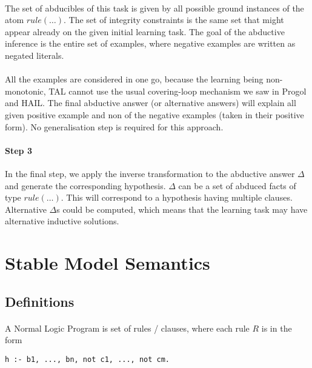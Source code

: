 \documentclass{article}
\theoremstyle{plain}
\theoremstyle{definition}
\begin{document}
\begin{multicols}{2}
\paragraph{} The set of abducibles of this task is given by all possible ground instances of the atom $rule(\dots)$. The set of integrity constraints is the same set that might appear already on the given initial  learning task. The goal of the abductive inference is the entire set of examples, where negative examples are written as negated literals.

\paragraph{} All the examples are considered in one go, because the learning being non-monotonic, TAL cannot use the usual covering-loop mechanism we saw in Progol and HAIL. The final abductive answer (or alternative answers) will explain all given positive example and non of the negative examples (taken in their positive form). No generalisation step is required for this approach.

\paragraph{Step 3} In the final step, we apply the inverse transformation to the abductive answer $\Delta$ and generate the corresponding hypothesis. $\Delta$ can be a set of abduced facts of type $rule(\dots)$. This will correspond to a hypothesis having multiple clauses. Alternative $\Delta$s could be computed, which means that the learning task may have alternative inductive solutions.

\section{Stable Model Semantics}

\subsection{Definitions}

\paragraph{} A Normal Logic Program is set of rules / clauses, where each rule $R$ is in the form

\begin{lstlisting}
h :- b1, ..., bn, not c1, ..., not cm.
\end{lstlisting}


\end{multicols}
\end{document}
